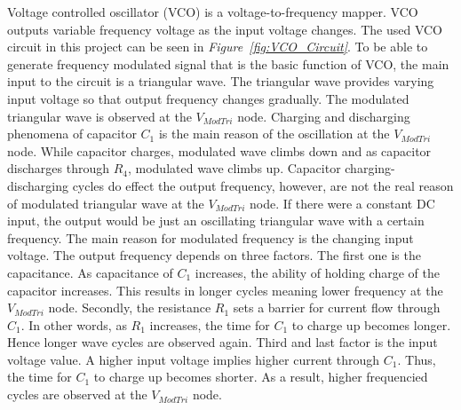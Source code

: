 \documentclass[paper]{IEEEtran}
\begin{document}
	Voltage controlled oscillator (VCO) is a voltage-to-frequency mapper. VCO outputs variable frequency voltage as the input voltage changes. The used VCO circuit in this project can be seen in \textit{Figure~\ref{fig:VCO_Circuit}}. To be able to generate frequency modulated signal that is the basic function of VCO, the main input to the circuit is a triangular wave. The triangular wave provides varying input voltage so that output frequency changes gradually. The modulated triangular wave is observed at the $V_{ModTri}$ node. Charging and discharging phenomena of capacitor $C_{1}$ is the main reason of the oscillation at the $V_{ModTri}$ node. While capacitor charges, modulated wave climbs down and as capacitor discharges through $R_{4}$, modulated wave climbs up. Capacitor charging-discharging cycles do effect the output frequency, however, are not the real reason of modulated triangular wave at the $V_{ModTri}$ node. If there were a constant DC input, the output would be just an oscillating triangular wave with a certain frequency. The main reason for modulated frequency is the changing input voltage. The output frequency depends on three factors. The first one is the capacitance. As capacitance of $C_{1}$ increases, the ability of holding charge of the capacitor increases. This results in longer cycles meaning lower frequency at the $V_{ModTri}$ node. Secondly, the resistance $R_{1}$ sets a barrier for current flow through $C_{1}$. In other words, as $R_{1}$ increases, the time for $C_{1}$ to charge up becomes longer. Hence longer wave cycles are observed again. Third and last factor is the input voltage value. A higher input voltage implies higher current through $C_{1}$. Thus, the time for $C_{1}$ to charge up becomes shorter. As a result, higher frequencied cycles are observed at the $V_{ModTri}$ node.
\end{document}

